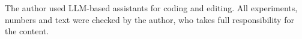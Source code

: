 The author used LLM-based assistants for coding and editing. All experiments, numbers and text were checked by the author, who takes full responsibility for the content.
